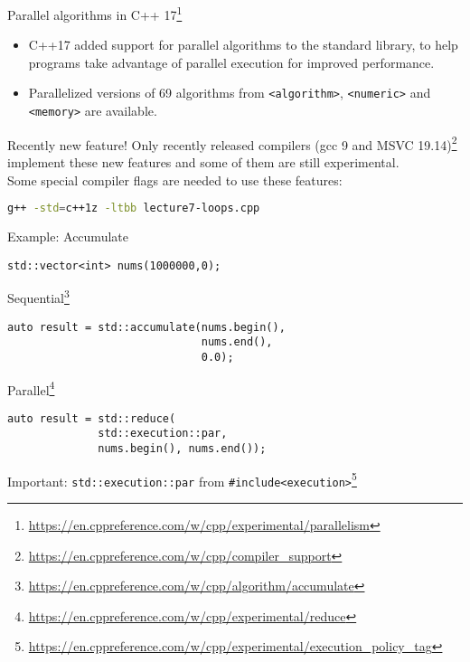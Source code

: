 \documentclass[12pt,t]{beamer}
\begin{document}
\begin{frame}[fragile]{Parallel algorithms in C++ 17\footnote{\tiny\url{https://en.cppreference.com/w/cpp/experimental/parallelism}}}
\begin{itemize}
\item C++17 added support for parallel algorithms to the standard library, to help programs take advantage of parallel execution for improved performance.
\item Parallelized versions of 69 algorithms from \lstinline|<algorithm>|, \lstinline|<numeric>| and \lstinline|<memory>| are available. 
\end{itemize}

\begin{block}{Recently new feature!}
Only recently released compilers (gcc 9 and MSVC 19.14)\footnote{\tiny\url{https://en.cppreference.com/w/cpp/compiler_support}} implement these new features and some of them are still experimental.\\
\vspace{0.5cm}
Some special compiler flags are needed to use these features:

\begin{lstlisting}[language=bash]
g++ -std=c++1z -ltbb lecture7-loops.cpp 
\end{lstlisting}
\end{block}
\end{frame}

\begin{frame}[fragile]{Example: Accumulate}

\begin{lstlisting}
std::vector<int> nums(1000000,0);
\end{lstlisting}

\begin{block}{Sequential\footnote{\tiny\url{https://en.cppreference.com/w/cpp/algorithm/accumulate}}}
\begin{lstlisting}
auto result = std::accumulate(nums.begin(), 
                              nums.end(),
                              0.0);
\end{lstlisting}
\end{block}

\begin{block}{Parallel\footnote{\tiny\url{https://en.cppreference.com/w/cpp/experimental/reduce}}}
\begin{lstlisting}
auto result = std::reduce(
              std::execution::par,
              nums.begin(), nums.end());
\end{lstlisting}
\end{block}

Important: \lstinline|std::execution::par| from \lstinline|#include<execution>|\footnote{\tiny\url{https://en.cppreference.com/w/cpp/experimental/execution_policy_tag}}
\end{frame}
\end{document}
